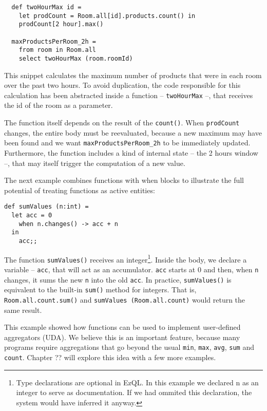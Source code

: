 \documentclass[a4,11pt]{report}
\begin{document}
\begin{lstlisting}
  def twoHourMax id =
    let prodCount = Room.all[id].products.count() in
    prodCount[2 hour].max()

  maxProductsPerRoom_2h =
    from room in Room.all
    select twoHourMax (room.roomId)
\end{lstlisting}

This snippet calculates the maximum number of products that were in
each room over the past two hours. To avoid duplication, the code
responsible for this calculation has been abstracted inside a function
-- \verb=twoHourMax= --, that receives the id of the room as a
parameter.

The function itself depends on the result of the \verb=count()=. When
\verb=prodCount= changes, the entire body must be reevaluated, because
a new maximum may have been found and we want
\verb=maxProductsPerRoom_2h= to be immediately updated. Furthermore,
the function includes a kind of internal state -- the 2 hours window
--, that may itself trigger the computation of a new value.

The next example combines functions with when blocks to illustrate the
full potential of treating functions as active entities:

\begin{lstlisting}
def sumValues (n:int) =
  let acc = 0
    when n.changes() -> acc + n
  in
    acc;;
\end{lstlisting}

The function \verb=sumValues()= receives an integer\footnote{Type
  declarations are optional in EzQL. In this example we declared n as
  an integer to serve as documentation. If we had ommited this
  declaration, the system would have inferred it anyway.}. Inside the
body, we declare a variable -- \verb=acc=, that will act as an
accumulator. \verb=acc= starts at 0 and then, when \verb=n= changes,
it sums the new \verb=n= into the old \verb=acc=. In practice,
\verb=sumValues()= is equivalent to the built-in \verb=sum()= method
for integers. That is, \verb=Room.all.count.sum()= and
\verb=sumValues (Room.all.count)= would return the same result.

This example showed how functions can be used to implement
user-defined aggregators (UDA). We believe this is an important
feature, because many programs require aggregations that go beyond the
usual \verb=min=, \verb=max=, \verb=avg=, \verb=sum= and
\verb=count=. Chapter ?? will explore this idea with a few more
examples.
\end{document}
